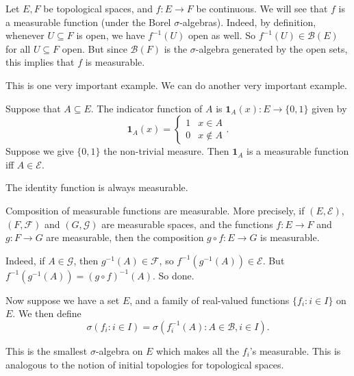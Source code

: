 \documentclass[a4paper]{article}
\begin{document}
\begin{eg}
  Let $E, F$ be topological spaces, and $f: E \to F$ be continuous. We will see that $f$ is a measurable function (under the Borel $\sigma$-algebras). Indeed, by definition, whenever $U \subseteq F$ is open, we have $f^{-1}(U)$ open as well. So $f^{-1}(U) \in \mathcal{B}(E)$ for all $U \subseteq F$ open. But since $\mathcal{B}(F)$ is the $\sigma$-algebra generated by the open sets, this implies that $f$ is measurable.
\end{eg}

This is one very important example. We can do another very important example.

\begin{eg}
  Suppose that $A \subseteq E$. The indicator function of $A$ is $\boldsymbol1_A(x): E \to \{0, 1\}$ given by
  \[
    \boldsymbol1_A(x) =
    \begin{cases}
      1 & x \in A\\
      0 & x \not\in A
    \end{cases}.
  \]
  Suppose we give $\{0, 1\}$ the non-trivial measure. Then $\boldsymbol1_A$ is a measurable function iff $A \in \mathcal{E}$.
\end{eg}

\begin{eg}
  The identity function is always measurable.
\end{eg}

\begin{eg}
  Composition of measurable functions are measurable. More precisely, if $(E, \mathcal{E})$, $(F, \mathcal{F})$ and $(G, \mathcal{G})$ are measurable spaces, and the functions $f: E \to F$ and $g: F \to G$ are measurable, then the composition $g \circ f: E \to G$ is measurable.

  Indeed, if $A \in \mathcal{G}$, then $g^{-1}(A) \in \mathcal{F}$, so $f^{-1}(g^{-1}(A)) \in \mathcal{E}$. But $f^{-1}(g^{-1}(A)) = (g \circ f)^{-1}(A)$. So done.
\end{eg}

\begin{defi}
  Now suppose we have a set $E$, and a family of real-valued functions $\{f_i: i \in I\}$ on $E$. We then define
  \[
    \sigma(f_i: i \in I) = \sigma(f^{-1}_i(A): A \in \mathcal{B}, i \in I).
  \]
\end{defi}
This is the smallest $\sigma$-algebra on $E$ which makes all the $f_i$'s measurable. This is analogous to the notion of initial topologies for topological spaces.
\end{document}
